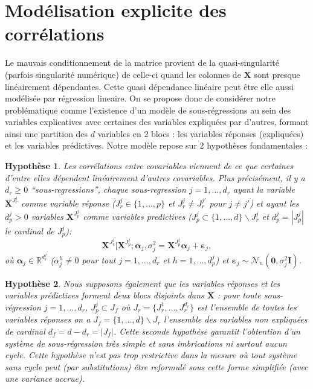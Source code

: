 \documentclass[12pt,a4paper]{report}
\newtheorem{hypfr}{Hypothèse}
\begin{document}
	\section{Modélisation explicite des corrélations}
	Le mauvais conditionnement de la matrice provient de la quasi-singularité (parfois singularité numérique) de celle-ci quand les colonnes de $\boldsymbol{X}$ sont presque linéairement dépendantes. Cette quasi dépendance linéaire peut être elle aussi modélisée par régression lineaire. On se propose donc de considérer notre problématique comme l'existence d'un modèle de sous-régressions au sein des variables explicatives avec certaines des variables expliquées par d'autres, formant ainsi une partition des $d$ variables en 2 blocs : les variables réponses (expliquées) et les variables prédictives. Notre modèle repose sur 2 hypothèses fondamentales :
	

\begin{hypfr}\label{H1fr}
Les corrélations entre covariables viennent de ce que certaines d'entre elles dépendent linéairement d'autres covariables. Plus précisément, il y a $d_{r}\geq 0$  ``sous-regressions'', chaque sous-regression $j=1,\ldots,d_{r}$ ayant la variable $\boldsymbol{X}^{J_{r}^j}$ comme variable {\it réponse} ($J_{r}^j\in\{1,\ldots,p\}$ et $J_{r}^j\neq J_{r}^{j'}$ pour $j\neq j'$) et ayant les $d_p^j>0$ variables $\boldsymbol{X}^{J_{p}^j}$  comme variables {\it predictives}  ($J_{p}^j\subset\{1,\ldots,d\} \backslash J_{r}^j$ et $d_p^j=|J_{p}^j|$ le cardinal de $J_{p}^j$):
\begin{equation}
\boldsymbol{X}^{J_{r}^j}|\boldsymbol{X}^{J_{p}^j};\boldsymbol{\alpha}_j,\sigma^2_j=\boldsymbol{X}^{J_{p}^j}\boldsymbol{\alpha}_j+\boldsymbol{\varepsilon}_j, \label{eq:SR_fr}
\end{equation}
où $\boldsymbol{\alpha}_j\in{\mathbb{R}^{d_r^j}}$ (${\alpha}_j^h\neq 0$ pour tout $j=1,\ldots,d_r$ et $h=1,\ldots,d_p^j$) et $\boldsymbol{\varepsilon}_j \sim\mathcal{N}_n(\boldsymbol{0},\sigma^2_j\boldsymbol{I})$.
\end{hypfr}

\begin{hypfr}\label{H2fr}
Nous supposons également que les variables réponses et les variables prédictives forment deux blocs disjoints dans $\boldsymbol{X}$ :
 pour toute sous-régression $j=1,\ldots,d_{r}$, $J_{p}^j\subset J_f$ où $J_{r}=\{J_{r}^1,\ldots,J_{r}^{d_r}\}$ est l'ensemble de toutes les variables réponses on a $J_f=\{1,\ldots,d\} \backslash J_{r}$ l'ensemble des variables non expliquées de cardinal $d_f=d-d_r=|J_f|$. Cette seconde hypothèse garantit l'obtention d'un système de sous-régression très simple et sans imbrications ni surtout aucun cycle. Cette hypothèse n'est pas trop restrictive dans la mesure où tout système sans cycle peut (par substitutions) être reformulé sous cette forme simplifiée (avec une variance accrue).
\end{hypfr}
\end{document}

